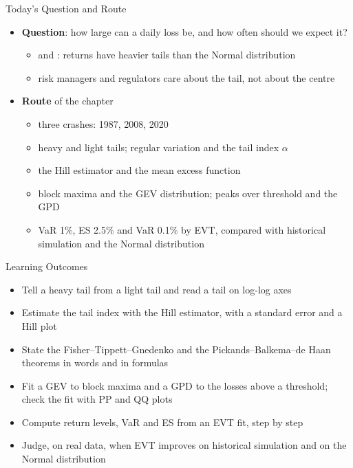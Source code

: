 \begin{frame}{Today's Question and Route}
\itemsize{\small}
\begin{itemize}
    \item \textbf{Question}: how large can a daily loss be, and how often should we expect it?
    \begin{itemize}
        \item {} and : returns have heavier tails than the Normal distribution
        \item risk managers and regulators care about the tail, not about the centre
    \end{itemize}
    \item \textbf{Route} of the chapter
    \begin{itemize}
        \item three crashes: 1987, 2008, 2020
        \item heavy and light tails; regular variation and the tail index $\alpha$
        \item the Hill estimator and the mean excess function
        \item block maxima and the GEV distribution; peaks over threshold and the GPD
        \item VaR 1\%, ES 2.5\% and VaR 0.1\% by EVT, compared with historical simulation and the Normal distribution
    \end{itemize}
\end{itemize}
\end{frame}

\begin{frame}{Learning Outcomes}
\itemsize{\small}
\begin{itemize}
    \item Tell a heavy tail from a light tail and read a tail on log-log axes
    \item Estimate the tail index with the Hill estimator, with a standard error and a Hill plot
    \item State the Fisher--Tippett--Gnedenko and the Pickands--Balkema--de Haan theorems in words and in formulas
    \item Fit a GEV to block maxima and a GPD to the losses above a threshold; check the fit with PP and QQ plots
    \item Compute return levels, VaR and ES from an EVT fit, step by step
    \item Judge, on real data, when EVT improves on historical simulation and on the Normal distribution
\end{itemize}
\end{frame}

